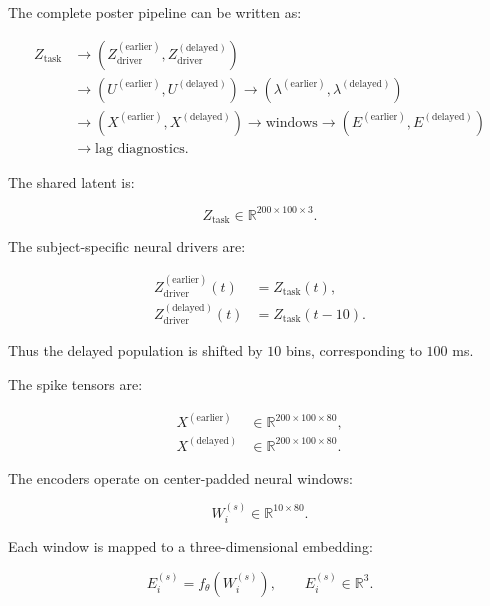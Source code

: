 \documentclass[11pt]{article}
\begin{document}
The complete poster pipeline can be written as:

\begin{align}
Z_{\text{task}}
&\rightarrow
\left(
Z_{\text{driver}}^{(\text{earlier})},
Z_{\text{driver}}^{(\text{delayed})}
\right)\\
&\rightarrow
\left(
U^{(\text{earlier})}, U^{(\text{delayed})}
\right)
\rightarrow
\left(
\lambda^{(\text{earlier})}, \lambda^{(\text{delayed})}
\right)\\
&\rightarrow
\left(
X^{(\text{earlier})}, X^{(\text{delayed})}
\right)
\rightarrow
\text{windows}
\rightarrow
\left(
E^{(\text{earlier})}, E^{(\text{delayed})}
\right)\\
&\rightarrow
\text{lag diagnostics}.
\end{align}

The shared latent is:

\begin{equation}
Z_{\text{task}} \in \mathbb{R}^{200 \times 100 \times 3}.
\end{equation}

The subject-specific neural drivers are:

\begin{align}
Z_{\text{driver}}^{(\text{earlier})}(t) &= Z_{\text{task}}(t),\\
Z_{\text{driver}}^{(\text{delayed})}(t) &= Z_{\text{task}}(t-10).
\end{align}

Thus the delayed population is shifted by $10$ bins, corresponding to
$100$ ms.

The spike tensors are:

\begin{align}
X^{(\text{earlier})} &\in \mathbb{R}^{200 \times 100 \times 80},\\
X^{(\text{delayed})} &\in \mathbb{R}^{200 \times 100 \times 80}.
\end{align}

The encoders operate on center-padded neural windows:

\begin{equation}
W_i^{(s)} \in \mathbb{R}^{10 \times 80}.
\end{equation}

Each window is mapped to a three-dimensional embedding:

\begin{equation}
E_i^{(s)} = f_\theta(W_i^{(s)}),
\qquad
E_i^{(s)} \in \mathbb{R}^{3}.
\end{equation}
\end{document}
